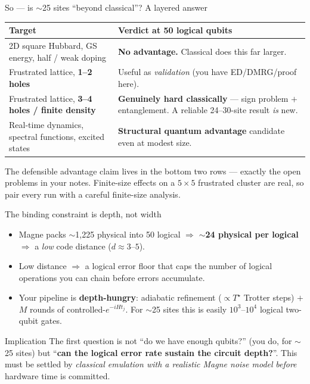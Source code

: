 \documentclass[aspectratio=169,11pt]{beamer}
\newcommand{\Tstar}{T^{\star}}
\begin{document}
\begin{frame}{So --- is $\sim$25 sites ``beyond classical''? A layered answer}
\renewcommand{\arraystretch}{1.3}
\begin{center}\small
\begin{tabular}{@{}p{5.6cm}p{6.2cm}@{}}
\toprule
\textbf{Target} & \textbf{Verdict at 50 logical qubits} \\
\midrule
2D square Hubbard, GS energy, half / weak doping
  & \textcolor{qnaccent}{\textbf{No advantage.}} Classical does this far larger. \\
Frustrated lattice, \textbf{1--2 holes}
  & Useful as \emph{validation} (you have ED/DMRG/proof here). \\
Frustrated lattice, \textbf{3--4 holes / finite density}
  & \textcolor{qngreen}{\textbf{Genuinely hard classically}} --- sign problem $+$
    entanglement. A reliable 24--30-site result \emph{is} new. \\
Real-time dynamics, spectral functions, excited states
  & \textcolor{qngreen}{\textbf{Structural quantum advantage}} candidate even at modest size. \\
\bottomrule
\end{tabular}
\end{center}
\vspace{2pt}
{\small\color{qngray} The defensible advantage claim lives in the bottom two rows ---
exactly the open problems in your notes. Finite-size effects on a $5\times5$ frustrated
cluster are real, so pair every run with a careful finite-size analysis.}
\end{frame}

\begin{frame}{The binding constraint is depth, not width}
\begin{itemize}
  \item Magne packs $\sim$1{,}225 physical into 50 logical $\Rightarrow$
        \textbf{$\sim$24 physical per logical} $\Rightarrow$ a \emph{low} code distance ($d\!\approx\!3$--$5$).
  \item Low distance $\Rightarrow$ a logical error floor that caps the number of
        logical operations you can chain before errors accumulate.
  \item Your pipeline is \textbf{depth-hungry}: adiabatic refinement
        ($\propto \Tstar$ Trotter steps) $+$ $M$ rounds of controlled-$e^{-iHt_j}$.
        For $\sim$25 sites this is easily $10^{3}$--$10^{4}$ logical two-qubit gates.
\end{itemize}
\begin{alertblock}{Implication}
The first question is not ``do we have enough qubits?'' (you do, for $\sim$25 sites)
but ``\textbf{can the logical error rate sustain the circuit depth?}''.
This must be settled by \emph{classical emulation with a realistic Magne noise model}
\emph{before} hardware time is committed.
\end{alertblock}
\end{frame}
\end{document}
